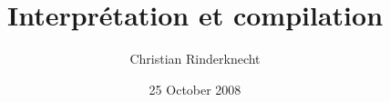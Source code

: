 \documentclass[compress,dvips,xcolor={dvipsnames},t]{beamer}
\title{Interprétation et compilation}
\author{Christian Rinderknecht}
\date{25 October 2008}
\begin{document}
\frame{\maketitle}





\end{document}
